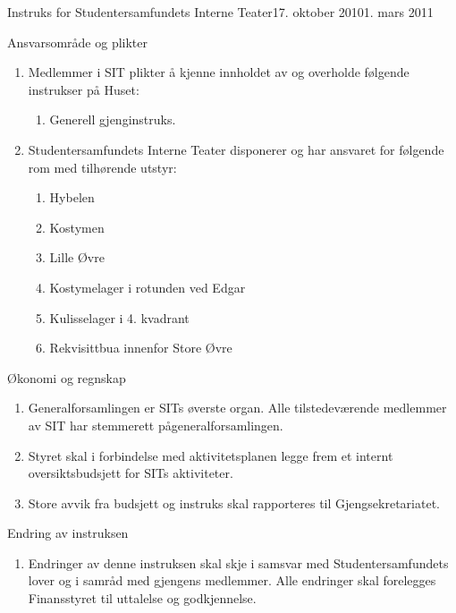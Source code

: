 \begin{instruks}{Instruks for Studentersamfundets Interne Teater}{17. oktober 2010}{1. mars 2011 }
	\begin{instruksledd}{Ansvarsområde og plikter}
		\begin{enumerate}   
			\item  Medlemmer i SIT plikter å kjenne innholdet av og overholde følgende instrukser på
				Huset:
				\begin{enumerate}
					\item Generell gjenginstruks.
				\end{enumerate}
			\item Studentersamfundets Interne Teater disponerer og har ansvaret for følgende rom med
				tilhørende utstyr:
				\begin{enumerate}
					\item Hybelen
					\item Kostymen
					\item Lille Øvre
					\item Kostymelager i rotunden ved Edgar
					\item Kulisselager i 4. kvadrant
					\item Rekvisittbua innenfor Store Øvre
				\end{enumerate}
		\end{enumerate}
	\end{instruksledd}

	\begin{instruksledd}{Økonomi og regnskap}
		\begin{enumerate}
			\item Generalforsamlingen er SITs øverste organ. Alle tilstedeværende
				medlemmer av SIT har stemmerett pågeneralforsamlingen. 
			\item Styret skal i forbindelse med aktivitetsplanen legge frem et
				internt oversiktsbudsjett for SITs aktiviteter.
			\item Store avvik fra budsjett og instruks skal rapporteres til
				Gjengsekretariatet.
		\end{enumerate}  
	\end{instruksledd}


	\begin{instruksledd}{Endring av instruksen}
		\begin{enumerate}
			\item Endringer av denne instruksen skal skje i samsvar med
				Studentersamfundets lover og i samråd med gjengens medlemmer. Alle endringer skal forelegges
				Finansstyret til uttalelse og godkjennelse.		
		\end{enumerate}  
	\end{instruksledd}


\end{instruks}
